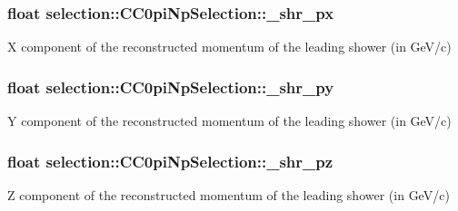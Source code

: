 \subsubsection[{\texorpdfstring{\+\_\+shr\+\_\+px}{_shr_px}}]{\setlength{\rightskip}{0pt plus 5cm}float selection\+::\+C\+C0pi\+Np\+Selection\+::\+\_\+shr\+\_\+px\hspace{0.3cm}{\ttfamily [private]}}\hypertarget{classselection_1_1CC0piNpSelection_a52e2043c82f5de7f93ac9bad63563f18}{}\label{classselection_1_1CC0piNpSelection_a52e2043c82f5de7f93ac9bad63563f18}
X component of the reconstructed momentum of the leading shower (in Ge\+V/c) 
\subsubsection[{\texorpdfstring{\+\_\+shr\+\_\+py}{_shr_py}}]{\setlength{\rightskip}{0pt plus 5cm}float selection\+::\+C\+C0pi\+Np\+Selection\+::\+\_\+shr\+\_\+py\hspace{0.3cm}{\ttfamily [private]}}\hypertarget{classselection_1_1CC0piNpSelection_a436dd7081c84003dabb595289d745111}{}\label{classselection_1_1CC0piNpSelection_a436dd7081c84003dabb595289d745111}
Y component of the reconstructed momentum of the leading shower (in Ge\+V/c) 
\subsubsection[{\texorpdfstring{\+\_\+shr\+\_\+pz}{_shr_pz}}]{\setlength{\rightskip}{0pt plus 5cm}float selection\+::\+C\+C0pi\+Np\+Selection\+::\+\_\+shr\+\_\+pz\hspace{0.3cm}{\ttfamily [private]}}\hypertarget{classselection_1_1CC0piNpSelection_a769319ad32b6ce49c7a5283b246303fa}{}\label{classselection_1_1CC0piNpSelection_a769319ad32b6ce49c7a5283b246303fa}
Z component of the reconstructed momentum of the leading shower (in Ge\+V/c) 
